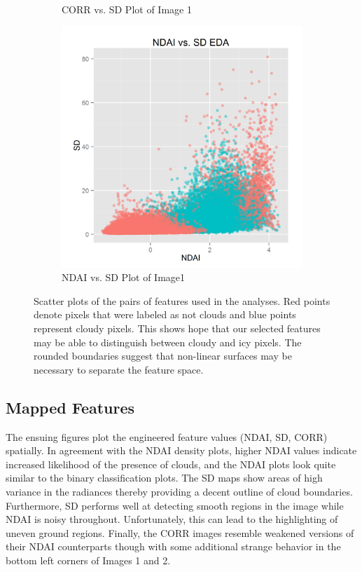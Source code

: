 \documentclass{article}\usepackage[]{graphicx}\usepackage[]{color}
\begin{document}
\begin{figure}[h]
\begin{subfigure}[b]{0.3\textwidth}
    \caption{CORR vs. SD Plot of Image 1}
    \label{CorrSd}
  \end{subfigure}  
  \begin{subfigure}[b]{0.3\textwidth}
    \includegraphics[width=\linewidth]{NDAI_vs_SD.png}
    \caption{NDAI vs. SD Plot of Image1}
    \label{NdaiSd}
  \end{subfigure}
  \caption{Scatter plots of the pairs of features used in the analyses. Red points denote pixels that were labeled as not clouds and blue points represent cloudy pixels. This shows hope that our selected features may be able to distinguish between cloudy and icy pixels.  The rounded boundaries suggest that non-linear surfaces may be necessary to separate the feature space.}
  \label{fig:Scatter}
\end{figure}

\subsection{Mapped Features}
The ensuing figures plot the engineered feature values (NDAI, SD, CORR) spatially. In agreement with the NDAI density plots, higher NDAI values indicate increased likelihood of the presence of clouds, and the NDAI plots look quite similar to the binary classification plots. The SD maps show areas of high variance in the radiances thereby providing a decent outline of cloud boundaries. Furthermore, SD performs well at detecting smooth regions in the image while NDAI is noisy throughout. Unfortunately, this can lead to the highlighting of uneven ground regions. Finally, the CORR images resemble weakened versions of their NDAI counterparts though with some additional strange behavior in the bottom left corners of Images 1 and 2. 
\end{document}
